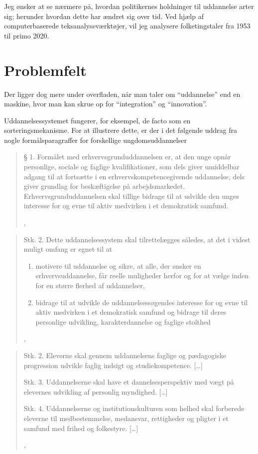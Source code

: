 Jeg ønsker at se nærmere på, hvordan politikernes holdninger til uddannelse arter sig; herunder hvordan dette har ændret sig over tid.
Ved hjælp af computerbaserede teksanalyseværktøjer, vil jeg analysere folketingstaler fra 1953 til primo 2020.

\chapter{Problemfelt}\label{sec:problem}
Der ligger dog mere under overfladen, når man taler om “uddannelse” end en maskine, hvor man kan skrue op for “integration” og “innovation”.

Uddannelsessystemet fungerer, for eksempel, de facto som en sorteringsmekanisme.
For at illustrere dette, er der i det følgende uddrag fra nogle formålsparagraffer for forskellige ungdomsuddannelser 

\blockquote[,  \cite{uddannelsesministerietBekendtgorelseAfLov2016a}]{
§ 1. Formålet med erhvervsgrunduddannelsen er, at den unge opnår personlige, sociale og faglige kvalifikationer, som dels giver umiddelbar adgang til at fortsætte i en erhvervskompetencegivende uddannelse, dels giver grundlag for beskæftigelse på arbejdsmarkedet. 
Erhvervsgrunduddannelsen skal tillige bidrage til at udvikle den unges interesse for og evne til aktiv medvirken i et demokratisk samfund.
}
\blockquote[,  \cite{uddannelsesministerietBekendtgorelseAfLov2020}]{
Stk. 2. Dette uddannelsessystem skal tilrettelægges således, at det i videst muligt omfang er egnet til at
\begin{enumerate}
  \item
    motivere til uddannelse og sikre, at alle, der ønsker en erhvervsuddannelse, får reelle muligheder herfor og for at vælge inden for en større flerhed af uddannelser, \textins[\ldots]

  \item
    bidrage til at udvikle de uddannelsessøgendes interesse for og evne til aktiv medvirken i et demokratisk samfund og bidrage til deres personlige udvikling, karakterdannelse og faglige stolthed \textins[\ldots]
\end{enumerate}
}
\blockquote[, \cite{uddannelsesministerietBekendtgorelseAfLov2019}]{

  Stk. 2. Eleverne skal gennem uddannelsens faglige og pædagogiske progression udvikle faglig indsigt og studiekompetence. [\ldots]

  Stk. 3. Uddannelserne skal have et dannelsesperspektiv med vægt på elevernes udvikling af personlig myndighed. [\ldots]

  Stk. 4. Uddannelserne og institutionskulturen som helhed skal forberede eleverne til medbestemmelse, medansvar, rettigheder og pligter i et samfund med frihed og folkestyre. [\ldots]
}

